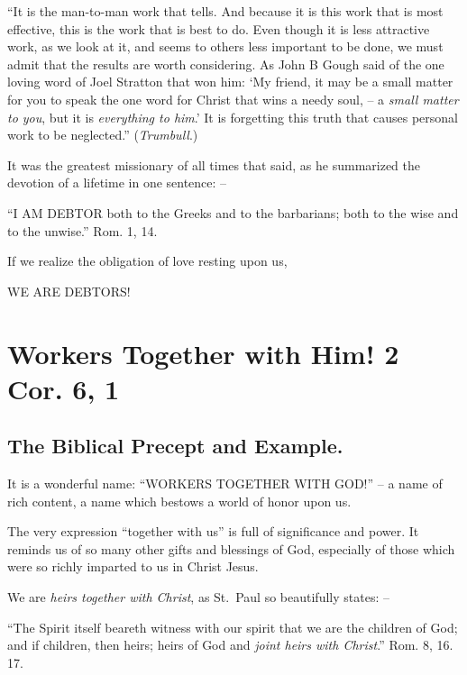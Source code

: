 \documentclass[
]{book}
\begin{document}
``It is the man-to-man work that tells. And because it is this work that is most effective, this is the work that is best to do. Even though it is less attractive work, as we look at it, and seems to others less important to be done, we must admit that the results are worth considering. As John B Gough said of the one loving word of Joel Stratton that won him: `My friend, it may be a small matter for you to speak the one word for Christ that wins a needy soul, -- a \emph{small matter to you}, but it is \emph{everything to him}.' It is forgetting this truth that causes personal work to be neglected.'' (\emph{Trumbull}.)

It was the greatest missionary of all times that said, as he summarized the devotion of a lifetime in one sentence: --

``I AM DEBTOR both to the Greeks and to the barbarians; both to the wise and to the unwise.'' Rom. 1, 14.

If we realize the obligation of love resting upon us,

\begin{center} WE ARE DEBTORS! \end{center}

\hypertarget{workers-together-with-him-2-cor.-6-1}{%
\chapter{Workers Together with Him! 2 Cor. 6, 1}\label{workers-together-with-him-2-cor.-6-1}}

\hypertarget{the-biblical-precept-and-example.}{%
\section*{The Biblical Precept and Example.}\label{the-biblical-precept-and-example.}}

It is a wonderful name: ``WORKERS TOGETHER WITH GOD!'' -- a name of rich content, a name which bestows a world of honor upon us.

The very expression ``together with us'' is full of significance and power. It reminds us of so many other gifts and blessings of God, especially of those which were so richly imparted to us in Christ Jesus.

We are \emph{heirs together with Christ}, as St.~Paul so beautifully states: --

``The Spirit itself beareth witness with our spirit that we are the children of God; and if children, then heirs; heirs of God and \emph{joint heirs with Christ}.'' Rom. 8, 16. 17.
\end{document}
